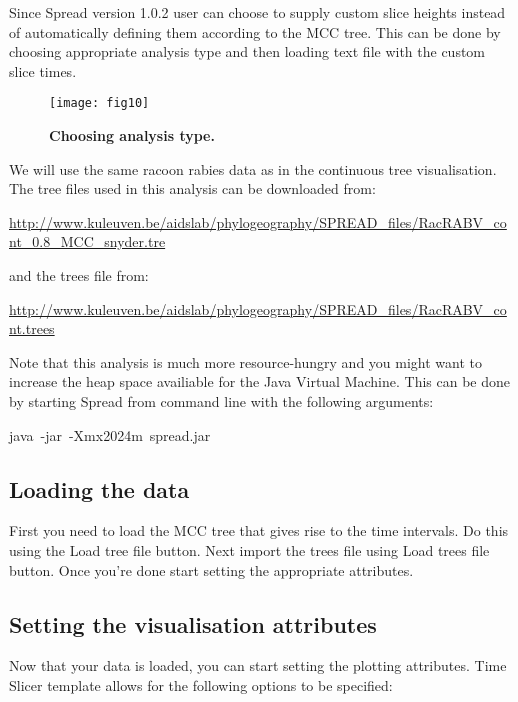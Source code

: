 Since Spread version 1.0.2 user can choose to supply custom slice
heights instead of automatically defining them according to the MCC
tree. This can be done by choosing appropriate analysis type and then
loading text file with the custom slice times.

\begin{figure}[h!]
\begin{centering}
\texttt{[image: fig10]}
\caption{
{ \footnotesize 
{\bf Choosing analysis type.}
} %
}
\label{fig:10}
\par\end{centering}
\end{figure}

We will use the same racoon rabies data as in the continuous tree
visualisation. The tree files used in this analysis can be downloaded
from:

\url{http://www.kuleuven.be/aidslab/phylogeography/SPREAD_files/RacRABV_cont_0.8_MCC_snyder.tre}

\noindent
and the trees file from:

\url{http://www.kuleuven.be/aidslab/phylogeography/SPREAD_files/RacRABV_cont.trees}

\noindent
Note that this analysis is much more resource-hungry and you might
want to increase the heap space availiable for the Java Virtual Machine.
This can be done by starting Spread from command line with the following
arguments: 

\begin{lyxcode}
java~-jar~-Xmx2024m~spread.jar
\end{lyxcode}

\subsection{Loading the data}

First you need to load the MCC tree that gives rise to the time intervals.
Do this using the Load tree file button. Next import the trees file
using Load trees file button. Once you're done start setting the appropriate
attributes.


\subsection{Setting the visualisation attributes}

Now that your data is loaded, you can start setting the plotting attributes.
Time Slicer template allows for the following options to be specified: 

